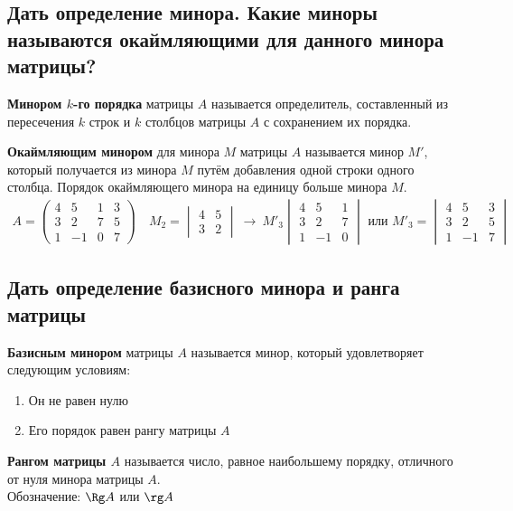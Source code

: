 \subsection{Дать определение минора. Какие миноры называются окаймляющими для данного минора матрицы?}
\begin{definition*}
	\textbf{Минором $k$-го порядка} матрицы $A$ называется определитель, составленный из пересечения $k$ строк и $k$ столбцов матрицы $A$ с сохранением их порядка.
\end{definition*}
\begin{definition*}
	\textbf{Окаймляющим минором} для минора $M$ матрицы $A$ называется минор $M'$, который получается из минора $M$ путём добавления одной строки одного столбца.
	Порядок окаймляющего минора на единицу больше минора $M$.
	\begin{gather*}
		A = \begin{pmatrix}
			4 & 5  & 1 & 3 \\
			3 & 2  & 7 & 5 \\
			1 & -1 & 0 & 7
		\end{pmatrix} \quad M_2 = \begin{vmatrix}
			4 & 5 \\
			3 & 2
		\end{vmatrix}\ \longrightarrow\
		M'_3\begin{vmatrix}
			4 & 5  & 1 \\
			3 & 2  & 7 \\
			1 & -1 & 0
		\end{vmatrix} \text{ или } M'_3 = \begin{vmatrix}
			4 & 5  & 3 \\
			3 & 2  & 5 \\
			1 & -1 & 7
		\end{vmatrix}
	\end{gather*}
\end{definition*}

\subsection{Дать определение базисного минора и ранга матрицы}
\begin{definition*}
	\textbf{Базисным минором} матрицы $A$ называется минор, который удовлетворяет следующим условиям:
	\begin{enumerate}
		\item Он не равен нулю
		\item Его порядок равен рангу матрицы $A$
	\end{enumerate}
\end{definition*}
\begin{definition*}
	\textbf{Рангом матрицы $A$} называется число, равное наибольшему порядку, отличного от нуля минора матрицы $A$.\\
	Обозначение: $\Rg A$ или $\rg A$
\end{definition*}

